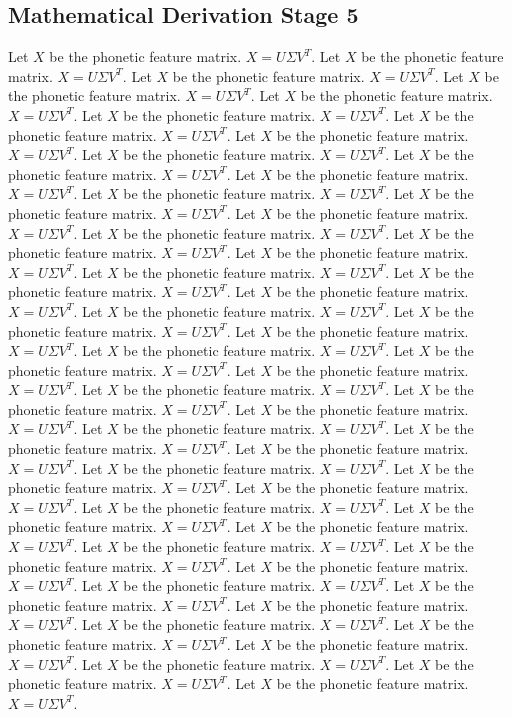 \subsection{Mathematical Derivation Stage 5}
Let $X$ be the phonetic feature matrix. $X = U\Sigma V^T$. Let $X$ be the phonetic feature matrix. $X = U\Sigma V^T$. Let $X$ be the phonetic feature matrix. $X = U\Sigma V^T$. Let $X$ be the phonetic feature matrix. $X = U\Sigma V^T$. Let $X$ be the phonetic feature matrix. $X = U\Sigma V^T$. Let $X$ be the phonetic feature matrix. $X = U\Sigma V^T$. Let $X$ be the phonetic feature matrix. $X = U\Sigma V^T$. Let $X$ be the phonetic feature matrix. $X = U\Sigma V^T$. Let $X$ be the phonetic feature matrix. $X = U\Sigma V^T$. Let $X$ be the phonetic feature matrix. $X = U\Sigma V^T$. Let $X$ be the phonetic feature matrix. $X = U\Sigma V^T$. Let $X$ be the phonetic feature matrix. $X = U\Sigma V^T$. Let $X$ be the phonetic feature matrix. $X = U\Sigma V^T$. Let $X$ be the phonetic feature matrix. $X = U\Sigma V^T$. Let $X$ be the phonetic feature matrix. $X = U\Sigma V^T$. Let $X$ be the phonetic feature matrix. $X = U\Sigma V^T$. Let $X$ be the phonetic feature matrix. $X = U\Sigma V^T$. Let $X$ be the phonetic feature matrix. $X = U\Sigma V^T$. Let $X$ be the phonetic feature matrix. $X = U\Sigma V^T$. Let $X$ be the phonetic feature matrix. $X = U\Sigma V^T$. Let $X$ be the phonetic feature matrix. $X = U\Sigma V^T$. Let $X$ be the phonetic feature matrix. $X = U\Sigma V^T$. Let $X$ be the phonetic feature matrix. $X = U\Sigma V^T$. Let $X$ be the phonetic feature matrix. $X = U\Sigma V^T$. Let $X$ be the phonetic feature matrix. $X = U\Sigma V^T$. Let $X$ be the phonetic feature matrix. $X = U\Sigma V^T$. Let $X$ be the phonetic feature matrix. $X = U\Sigma V^T$. Let $X$ be the phonetic feature matrix. $X = U\Sigma V^T$. Let $X$ be the phonetic feature matrix. $X = U\Sigma V^T$. Let $X$ be the phonetic feature matrix. $X = U\Sigma V^T$. Let $X$ be the phonetic feature matrix. $X = U\Sigma V^T$. Let $X$ be the phonetic feature matrix. $X = U\Sigma V^T$. Let $X$ be the phonetic feature matrix. $X = U\Sigma V^T$. Let $X$ be the phonetic feature matrix. $X = U\Sigma V^T$. Let $X$ be the phonetic feature matrix. $X = U\Sigma V^T$. Let $X$ be the phonetic feature matrix. $X = U\Sigma V^T$. Let $X$ be the phonetic feature matrix. $X = U\Sigma V^T$. Let $X$ be the phonetic feature matrix. $X = U\Sigma V^T$. Let $X$ be the phonetic feature matrix. $X = U\Sigma V^T$. Let $X$ be the phonetic feature matrix. $X = U\Sigma V^T$. Let $X$ be the phonetic feature matrix. $X = U\Sigma V^T$. Let $X$ be the phonetic feature matrix. $X = U\Sigma V^T$. Let $X$ be the phonetic feature matrix. $X = U\Sigma V^T$. Let $X$ be the phonetic feature matrix. $X = U\Sigma V^T$. Let $X$ be the phonetic feature matrix. $X = U\Sigma V^T$. Let $X$ be the phonetic feature matrix. $X = U\Sigma V^T$. Let $X$ be the phonetic feature matrix. $X = U\Sigma V^T$. Let $X$ be the phonetic feature matrix. $X = U\Sigma V^T$. Let $X$ be the phonetic feature matrix. $X = U\Sigma V^T$. Let $X$ be the phonetic feature matrix. $X = U\Sigma V^T$. 

